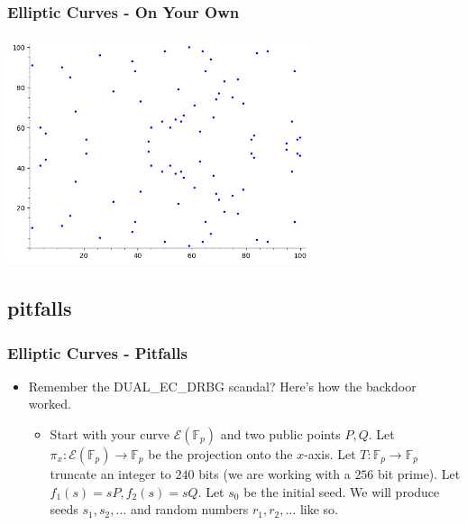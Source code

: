 \documentclass[aspectratio=169,t]{beamer}
\newcommand{\FF}{\mathbb{F}}
\begin{document}
\begin{frame}
\frametitle{Elliptic Curves - On Your Own}
\begin{center}
\includegraphics[height=18em]{plot}
\end{center}
\end{frame}

\subsection{pitfalls}
\begin{frame}
\frametitle{Elliptic Curves - Pitfalls}
\begin{itemize}
\item
Remember the DUAL\_EC\_DRBG scandal? Here's how the backdoor worked.
\begin{itemize}
\item
Start with your curve $\mathcal{E}(\FF_p)$ and two public points $P, Q$. Let
$\pi_x : \mathcal{E}(\FF_p) \to \FF_p$ be the projection onto the $x$-axis. Let
$T : \FF_p \to \FF_p$ truncate an integer to $240$ bits (we are working with a
$256$ bit prime). Let $f_1(s) = sP, f_2(s) = sQ$. Let $s_0$ be the initial seed.
We will produce seeds $s_1, s_2, \dots$ and random numbers $r_1, r_2, \dots$
like so.

\begin{center}
\end{center}
\end{itemize}
\end{itemize}
\end{frame}
\end{document}
